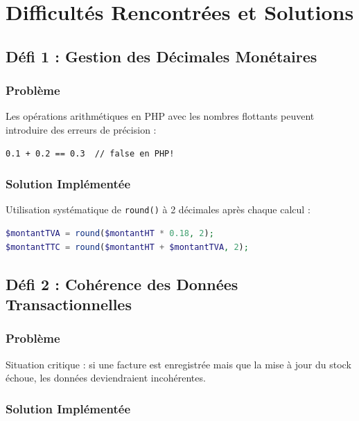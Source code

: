 \documentclass[12pt,a4paper]{report}
\begin{document}
\pagebreak

\chapter{Difficultés Rencontrées et Solutions}

\section{Défi 1 : Gestion des Décimales Monétaires}

\subsection{Problème}

Les opérations arithmétiques en PHP avec les nombres flottants peuvent introduire des erreurs de précision :

\begin{verbatim}
0.1 + 0.2 == 0.3  // false en PHP!
\end{verbatim}

\subsection{Solution Implémentée}

Utilisation systématique de \texttt{round()} à 2 décimales après chaque calcul :

\begin{lstlisting}[language=PHP]
$montantTVA = round($montantHT * 0.18, 2);
$montantTTC = round($montantHT + $montantTVA, 2);
\end{lstlisting}

\section{Défi 2 : Cohérence des Données Transactionnelles}

\subsection{Problème}

Situation critique : si une facture est enregistrée mais que la mise à jour du stock échoue, les données deviendraient incohérentes.

\subsection{Solution Implémentée}
\end{document}
